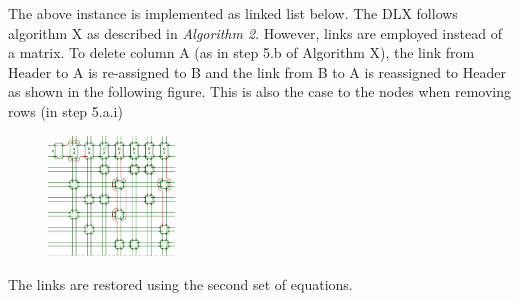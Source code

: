 \documentclass[a4paper,oneside,11pt]{report}
\newcounter{row}
\newcounter{col}
\begin{document}
The above instance is implemented as linked list below. The DLX follows algorithm X as described in \textit{Algorithm 2}.  However, links are employed instead of a matrix. To delete column A (as in step 5.b of Algorithm X), the link from Header to A is re-assigned to B and the link from B to A is reassigned to Header as shown in the following figure. This is also the case to the nodes when removing rows (in step 5.a.i)
\begin{figure}[h]
  \centering
  {\includegraphics[width=0.3\textwidth]{dlxlinkedlist.jpg}\label{fig:linkedlist}}
\end{figure}
\newline
The links are restored using the second set of equations.
\end{document}
